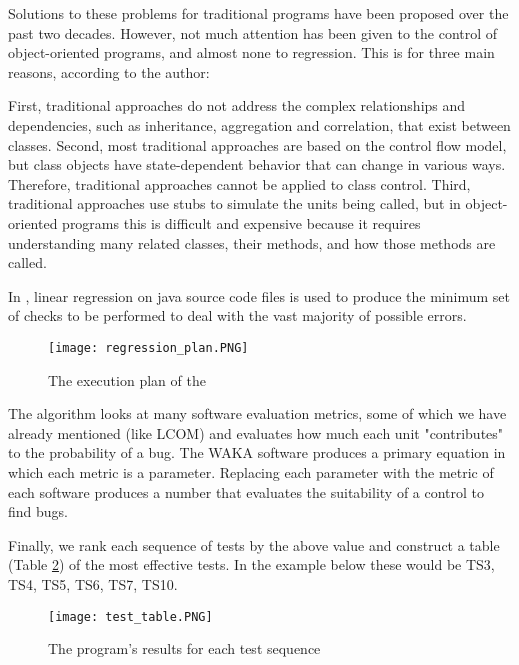 \documentclass[12pt]{article}
\begin{document}
\par Solutions to these problems for traditional programs have been proposed over the past two decades. However, not much attention has been given to the control of object-oriented programs, and almost none to regression. This is for three main reasons, according to the author:

\par First, traditional approaches do not address the complex relationships and dependencies, such as inheritance, aggregation and correlation, that exist between classes. Second, most traditional approaches are based on the control flow model, but class objects have state-dependent behavior that can change in various ways. Therefore, traditional approaches cannot be applied to class control. Third, traditional approaches use stubs to simulate the units being called, but in object-oriented programs this is difficult and expensive because it requires understanding many related classes, their methods, and how those methods are called.

In \textcite{divya}, linear regression on java source code files is used to produce the minimum set of checks to be performed to deal with the vast majority of possible errors.

\begin{figure}
\label{fig:regression}
\caption{The execution plan of the \textcite{divya}}
\texttt{[image: regression\_plan.PNG]}
\end{figure}

\par The algorithm looks at many software evaluation metrics, some of which we have already mentioned (like LCOM) and evaluates how much each unit "contributes" to the probability of a bug. The WAKA software produces a primary equation in which each metric is a parameter. Replacing each parameter with the metric of each software produces a number that evaluates the suitability of a control to find bugs. 

\par Finally, we rank each sequence of tests by the above value and construct a table (Table \ref{fig:test_table}) of the most effective tests. In the example below these would be TS3, TS4, TS5, TS6, TS7, TS10.

\begin{figure}
\label{fig:test_table}
\caption{The program's results for each test sequence}
\texttt{[image: test\_table.PNG]}
\end{figure}
\end{document}

